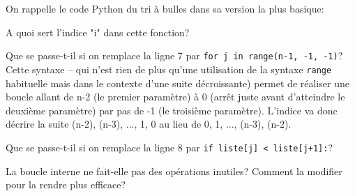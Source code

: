 \documentclass[12pt]{article}
\begin{document}
		\begin{MonExo}
		On rappelle le code Python du tri à bulles dans sa version la plus basique:
		\begin{alphenum}
			\item A quoi sert l'indice "i" dans cette fonction?
			\item Que se passe-t-il si on remplace la ligne 7 par \texttt{for j in range(n-1, -1, -1)}? Cette syntaxe  -- qui n'est rien de plus qu'une utilisation de la syntaxe \texttt{range} habituelle mais dans le contexte d'une suite décroissante) permet de réaliser une boucle allant de n-2 (le premier paramètre) à 0 (arrêt juste avant d'atteindre le deuxième paramètre) par pas de -1 (le troisième paramètre). L'indice va donc décrire la suite (n-2), (n-3), ..., 1, 0 au lieu de 0, 1, ..., (n-3), (n-2).
			\item Que se passe-t-il si on remplace la ligne 8 par \texttt{if liste[j] < liste[j+1]:}?
			\item La boucle interne ne fait-elle pas des opérations inutiles? Comment la modifier pour la rendre plus efficace?
		\end{alphenum}
		
	\end{MonExo}
	
\end{document}
